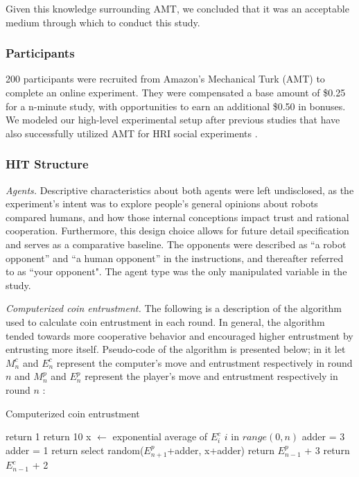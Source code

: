 \documentclass{sig-alternate}
\begin{document}
Given this knowledge surrounding AMT, we concluded that it was an acceptable medium through which to conduct this study.

\subsubsection{Participants}
200 participants were recruited from Amazon's Mechanical Turk (AMT) to complete an online experiment. They were compensated a base amount of \$0.25 for a n-minute study, with opportunities to earn an additional \$0.50 in bonuses. We modeled our high-level experimental setup after previous studies that have also successfully utilized AMT for HRI social experiments \cite{malle2015sacrifice}.

\subsubsection{HIT Structure}
\textit{Agents. } Descriptive characteristics about both agents were left undisclosed, as the experiment's intent was to explore people's general opinions about robots compared humans, and how those internal conceptions impact trust and rational cooperation. Furthermore, this design choice allows for future detail specification and serves as a comparative baseline. The opponents were described as ``a robot opponent'' and ``a human opponent'' in the instructions, and thereafter referred to as ``your opponent". The agent type was the only manipulated variable in the study.

\textit{Computerized coin entrustment. } The following is a description of the algorithm used to calculate coin entrustment in each round. In general, the algorithm tended towards more cooperative behavior and encouraged higher entrustment by entrusting more itself. Pseudo-code of the algorithm is presented below; in it let $M_{n}^c$ and $E_{n}^c$ represent the computer's move and entrustment respectively in round $n$ and $M_{n}^p$ and $E_{n}^p$ represent the player's move and entrustment respectively in round $n$ : 

\begin{algorithm}
\caption{Computerized coin entrustment}
\begin{algorithmic}
\STATE return 1
\STATE return 10 
\ELSE
\STATE x $\leftarrow$ exponential average of $E_{i}^c$  $i$ in $range(0,n)$
\STATE adder = 3
\ELSE
\STATE adder = 1
\ENDIF
\STATE return select random($E_{n+1}^p$+adder, x+adder)
\STATE return $E_{n-1}^p$ + 3
\STATE return $E_{n-1}^c$ + 2
\ENDIF
\ENDIF
\end{algorithmic}
\end{algorithm}
\end{document}
